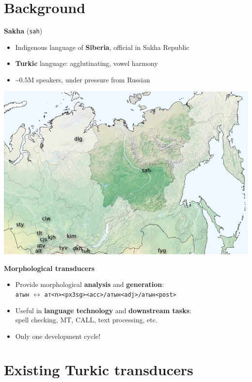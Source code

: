 \documentclass[a0paper,fleqn]{betterposter}
\newcommand{\mtag}[1]{\texttt{{\color{lightgray}<}#1{\color{lightgray}>}}}
\begin{document}
{\section{Background}
\textbf{Sakha} (\texttt{sah})
\begin{itemize}
\item Indigenous language of \textbf{Siberia}, official in Sakha Republic
\item \textbf{Turkic} language: agglutinating, vowel harmony
\item \textasciitilde{}0.5M speakers, under pressure from Russian
\end{itemize}
\begin{center}
\includegraphics[width=1\textwidth]{img/map.pdf}
\end{center}

\textbf{Morphological transducers}
\begin{itemize}
\item Provide morphological \textbf{analysis} and \textbf{generation}:\\
\texttt{атын} $\leftrightarrow$ \texttt{ат\mtag{n}\mtag{px3sg}\mtag{acc}/атын\mtag{adj}/атын\mtag{post}}
\item Useful in \textbf{language technology} and \textbf{downstream tasks}:\\
spell checking, MT, CALL, text processing, etc.
\item Only one development cycle!
\end{itemize}

\section{Existing Turkic transducers}

}
\end{document}
